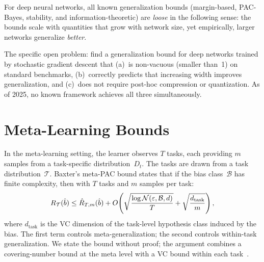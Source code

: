 \begin{openprob}
\label{op:deep-margins}
For deep neural networks, all known generalization bounds (margin-based,
PAC-Bayes, stability, and information-theoretic) are \emph{loose} in
the following sense: the bounds scale with quantities that grow with
network size, yet empirically, larger networks generalize \emph{better}.

The specific open problem: find a generalization bound for deep networks
trained by stochastic gradient descent that (a)~is non-vacuous (smaller
than~1) on standard benchmarks, (b)~correctly predicts that increasing
width improves generalization, and (c)~does not require post-hoc
compression or quantization.  As of 2025, no known framework achieves all
three simultaneously.
\end{openprob}



\section{Meta-Learning Bounds}
\label{sec:meta-pac}

\begin{thm}
\label{thm:meta-pac}
In the meta-learning setting, the learner observes $T$ tasks, each
providing $m$ samples from a task-specific distribution~$D_t$.  The tasks
are drawn from a task distribution~$\mathcal{T}$.  Baxter's meta-PAC
bound states that if the bias class~$\mathcal{B}$ has finite complexity,
then with $T$ tasks and $m$ samples per task:
\[
  R_\mathcal{T}(\hat{b}) \leq \hat{R}_{T,m}(\hat{b})
  + O\!\left(\sqrt{\frac{\log \mathcal{N}(\varepsilon,\mathcal{B},d)}{T}}
    + \sqrt{\frac{d_{\mathrm{task}}}{m}}\right),
\]
where $d_{\mathrm{task}}$ is the VC dimension of the task-level
hypothesis class induced by the bias.  The first term controls
meta-generalization; the second controls within-task generalization.  We
state the bound without proof; the argument combines a covering-number bound
at the meta level with a VC bound within each task~\cite{Baxter2000}.
\end{thm}



